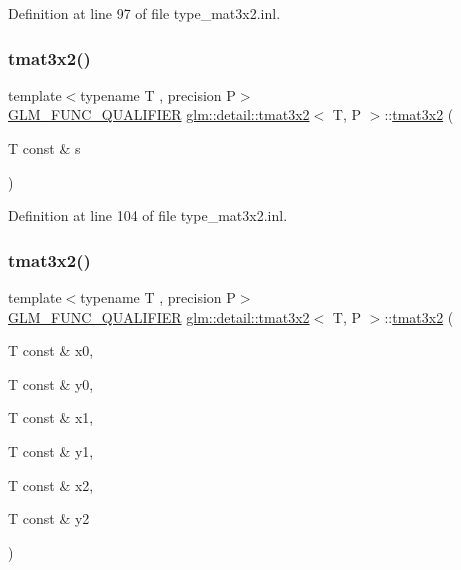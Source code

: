 Definition at line 97 of file type\+\_\+mat3x2.\+inl.

\mbox{\label{structglm_1_1detail_1_1tmat3x2_ab469e328c7d856fc0b999e9bc3c512e8}} 
\subsubsection{\texorpdfstring{tmat3x2()}{tmat3x2()}\hspace{0.1cm}{\footnotesize\ttfamily [5/22]}}
{\footnotesize\ttfamily template$<$typename T , precision P$>$ \\
\hyperlink{setup_8hpp_a33fdea6f91c5f834105f7415e2a64407}{G\+L\+M\+\_\+\+F\+U\+N\+C\+\_\+\+Q\+U\+A\+L\+I\+F\+I\+ER} \hyperlink{structglm_1_1detail_1_1tmat3x2}{glm\+::detail\+::tmat3x2}$<$ T, P $>$\+::\hyperlink{structglm_1_1detail_1_1tmat3x2}{tmat3x2} (\begin{DoxyParamCaption}\item[{T const \&}]{s }\end{DoxyParamCaption})\hspace{0.3cm}{\ttfamily [explicit]}}



Definition at line 104 of file type\+\_\+mat3x2.\+inl.

\mbox{\label{structglm_1_1detail_1_1tmat3x2_a680eecd8662a43d6f873da7c2577e7a2}} 
\subsubsection{\texorpdfstring{tmat3x2()}{tmat3x2()}\hspace{0.1cm}{\footnotesize\ttfamily [6/22]}}
{\footnotesize\ttfamily template$<$typename T , precision P$>$ \\
\hyperlink{setup_8hpp_a33fdea6f91c5f834105f7415e2a64407}{G\+L\+M\+\_\+\+F\+U\+N\+C\+\_\+\+Q\+U\+A\+L\+I\+F\+I\+ER} \hyperlink{structglm_1_1detail_1_1tmat3x2}{glm\+::detail\+::tmat3x2}$<$ T, P $>$\+::\hyperlink{structglm_1_1detail_1_1tmat3x2}{tmat3x2} (\begin{DoxyParamCaption}\item[{T const \&}]{x0,  }\item[{T const \&}]{y0,  }\item[{T const \&}]{x1,  }\item[{T const \&}]{y1,  }\item[{T const \&}]{x2,  }\item[{T const \&}]{y2 }\end{DoxyParamCaption})}



